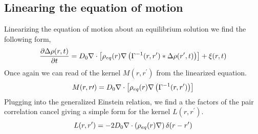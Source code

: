 \subsection{Linearing the equation of motion} %

Linearizing the equation of motion about an equilibrium solution we find the
following form,
%
\begin{equation} \frac{\partial \Delta \rho (r, t)}{\partial t} = D_0\nabla \cdot
\left[\rho_{eq}(r)\nabla \left(\Gamma^{-1}(r, r^\prime)\ast \Delta\rho(r^\prime,
t)\right)\right] + \xi(r, t) \end{equation}
%
Once again we can read of the kernel $M(r, r^\prime)$ from the linearized
equation.
%
\begin{equation} M(r, r\prime) = D_0\nabla \cdot \left[\rho_{eq}(r)\nabla
\left(\Gamma^{-1}(r, r^\prime)\right)\right] \end{equation}
%
Plugging into the generalized Einstein relation, we find a the factors of the
pair correlation cancel giving a simple form for the kernel $L(r, r^\prime)$.
%
\begin{equation} L(r, r^\prime) =
-2D_0\nabla\cdot\left(\rho_{eq}(r)\nabla\right)\delta(r - r^\prime) \end{equation}
%

\nocite{Ronis, Fox_and_Uhlenbeck, Lax}
